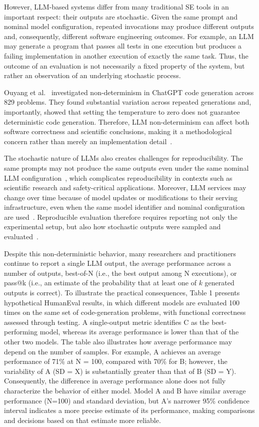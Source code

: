 \documentclass{IEEEcsmag}
\begin{document}
However, LLM-based systems differ from many traditional SE tools in an important respect: their outputs are stochastic. Given the same prompt and nominal model configuration, repeated invocations may produce different outputs and, consequently, different software engineering outcomes. For example, an LLM may generate a program that passes all tests in one execution but produces a failing implementation in another execution of exactly the same task. Thus, the outcome of an evaluation is not necessarily a fixed property of the system, but rather an observation of an underlying stochastic process.

Ouyang et al.~\cite{Ouyang2025} investigated non-determinism in ChatGPT code generation across 829 problems. They found substantial variation across repeated generations and, importantly, showed that setting the temperature to zero does not guarantee deterministic code generation. Therefore, LLM non-determinism can affect both software correctness and scientific conclusions, making it a methodological concern rather than merely an implementation detail~\cite{Ouyang2025}.

The stochastic nature of LLMs also creates challenges for reproducibility. The same prompts may not produce the same outputs even under the same nominal LLM configuration~\cite{Ouyang2025}, which complicates reproducibility in contexts such as scientific research and safety-critical applications. Moreover, LLM services may change over time because of model updates or modifications to their serving infrastructure, even when the same model identifier and nominal configuration are used~\cite{Chauvin2026,Kang2026}. Reproducible evaluation therefore requires reporting not only the experimental setup, but also how stochastic outputs were sampled and evaluated~\cite{Pineau2021}.

Despite this non-deterministic behavior, many researchers and practitioners continue to report a single LLM output, the average performance across a number of outputs, best-of-N (i.e., the best output among N executions), or pass@k (i.e., an estimate of the probability that at least one of $k$ generated outputs is correct). To illustrate the practical consequences, Table 1 presents hypothetical HumanEval results, in which different models are evaluated 100 times on the same set of code-generation problems, with functional correctness assessed through testing. A single-output metric identifies C as the best-performing model, whereas its average performance is lower than that of the other two models. The table also illustrates how average performance may depend on the number of samples. For example, A achieves an average performance of 71\% at N = 100, compared with 70\% for B; however, the variability of A (SD = X) is substantially greater than that of B (SD = Y). Consequently, the difference in average performance alone does not fully characterize the behavior of either model. Model A and B have similar average performance (N=100) and standard deviation, but A’s narrower 95\% confidence interval indicates a more precise estimate of its performance, making comparisons and decisions based on that estimate more reliable.
\end{document}
